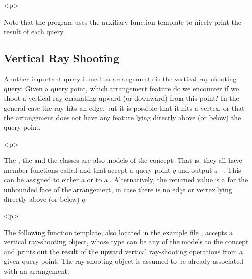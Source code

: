 
\begin{ccHtmlOnly}<p>\end{ccHtmlOnly}
Note that the program uses the auxiliary
 function template to nicely print the
result of each query.

\subsection{Vertical Ray Shooting}
\label{arr_ssec:ray_shoot}
%
Another important query issued on arrangements is the vertical
ray-shooting query: Given a query point, which arrangement feature
do we encounter if we shoot a vertical ray emanating upward (or
downward) from this point? In the general case the ray hits an
edge, but it is possible that it hits a vertex, or that the
arrangement does not have any feature lying directly above (or
below) the query point.

\begin{ccHtmlOnly}<p>\end{ccHtmlOnly}
The , the
 and the
 classes are also models of
the  concept. That is, they all
have member functions called  and
 that accept a query point $q$ and output a
\cgal\ . This can be assigned to either a
 or to a .
Alternatively, the returned value is a 
for the unbounded face of the arrangement, in case there is no edge
or vertex lying directly above (or below) $q$.

\begin{ccHtmlOnly}<p>\end{ccHtmlOnly}
The following function template, also located in the example file
, accepts a vertical ray-shooting
object, whose type can be any of the models to the
 concept and prints out the
result of the upward vertical ray-shooting operations from a given
query point. The ray-shooting object  is assumed to be
already associated with an arrangement:

